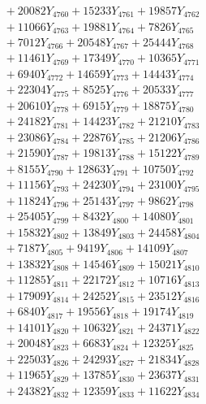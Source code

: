 \documentclass[a4paper,10pt]{article}
\begin{document}
{\begin{align}
&\;  + 20082 Y_{4760} + 15233 Y_{4761} + 19857 Y_{4762} \\[0.3ex]
&\;  + 11066 Y_{4763} + 19881 Y_{4764} + 7826 Y_{4765} \\[0.3ex]
&\;  + 7012 Y_{4766} + 20548 Y_{4767} + 25444 Y_{4768} \\[0.5ex]\allowbreak
&\;  + 11461 Y_{4769} + 17349 Y_{4770} + 10365 Y_{4771} \\[0.3ex]
&\;  + 6940 Y_{4772} + 14659 Y_{4773} + 14443 Y_{4774} \\[0.3ex]
&\;  + 22304 Y_{4775} + 8525 Y_{4776} + 20533 Y_{4777} \\[0.3ex]
&\;  + 20610 Y_{4778} + 6915 Y_{4779} + 18875 Y_{4780} \\[0.3ex]
&\;  + 24182 Y_{4781} + 14423 Y_{4782} + 21210 Y_{4783} \\[0.3ex]
&\;  + 23086 Y_{4784} + 22876 Y_{4785} + 21206 Y_{4786} \\[0.3ex]
&\;  + 21590 Y_{4787} + 19813 Y_{4788} + 15122 Y_{4789} \\[0.3ex]
&\;  + 8155 Y_{4790} + 12863 Y_{4791} + 10750 Y_{4792} \\[0.3ex]
&\;  + 11156 Y_{4793} + 24230 Y_{4794} + 23100 Y_{4795} \\[0.3ex]
&\;  + 11824 Y_{4796} + 25143 Y_{4797} + 9862 Y_{4798} \\[0.5ex]\allowbreak
&\;  + 25405 Y_{4799} + 8432 Y_{4800} + 14080 Y_{4801} \\[0.3ex]
&\;  + 15832 Y_{4802} + 13849 Y_{4803} + 24458 Y_{4804} \\[0.3ex]
&\;  + 7187 Y_{4805} + 9419 Y_{4806} + 14109 Y_{4807} \\[0.3ex]
&\;  + 13832 Y_{4808} + 14546 Y_{4809} + 15021 Y_{4810} \\[0.3ex]
&\;  + 11285 Y_{4811} + 22172 Y_{4812} + 10716 Y_{4813} \\[0.3ex]
&\;  + 17909 Y_{4814} + 24252 Y_{4815} + 23512 Y_{4816} \\[0.3ex]
&\;  + 6840 Y_{4817} + 19556 Y_{4818} + 19174 Y_{4819} \\[0.3ex]
&\;  + 14101 Y_{4820} + 10632 Y_{4821} + 24371 Y_{4822} \\[0.3ex]
&\;  + 20048 Y_{4823} + 6683 Y_{4824} + 12325 Y_{4825} \\[0.3ex]
&\;  + 22503 Y_{4826} + 24293 Y_{4827} + 21834 Y_{4828} \\[0.5ex]\allowbreak
&\;  + 11965 Y_{4829} + 13785 Y_{4830} + 23637 Y_{4831} \\[0.3ex]
&\;  + 24382 Y_{4832} + 12359 Y_{4833} + 11622 Y_{4834} \\[0.3ex]

\end{align}}
\end{document}
